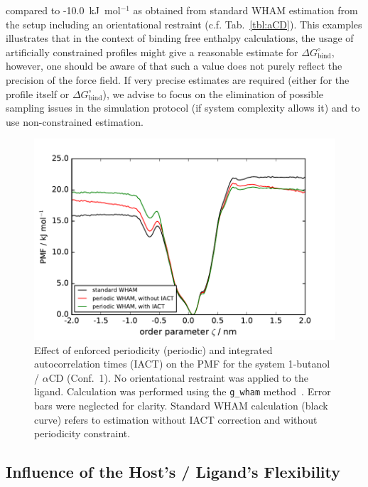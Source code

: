 \documentclass[9pt,lessons,pubversion]{livecoms}
\begin{document}
compared to -10.0~kJ~mol$^{-1}$ as obtained from standard WHAM estimation from the setup including an orientational restraint (c.f. Tab.~\ref{tbl:aCD}).
This examples illustrates that in the context of binding free enthalpy calculations, the usage of artificially constrained profiles might give a reasonable estimate for $\Delta G^\circ_\mathrm{bind}$, 
however, one should be aware of that such a value does not purely reflect the precision of the force field.
If very precise estimates are required (either for the profile itself or $\Delta G^\circ_\mathrm{bind}$), we advise to focus on the elimination of possible sampling issues in the simulation protocol (if system complexity allows it) 
and to use non-constrained estimation.

\begin{figure}
\includegraphics[width=\linewidth]{figures/pmf_aCD_BTL_gwham_cyclic.pdf}
  \caption{Effect of enforced periodicity (periodic) and integrated autocorrelation times (IACT) on the PMF for the system 1-butanol / $\alpha$CD (Conf.~1).
  No orientational restraint was applied to the ligand.
  Calculation was performed using the \texttt{g\_wham} method~\cite{hub2010g_wham}. Error bars were neglected for clarity.
  Standard WHAM calculation (black curve) refers to estimation without IACT correction and without periodicity constraint.
  }
  \label{fig:gwham}
\end{figure}


\subsection{Influence of the Host's / Ligand's Flexibility}
\end{document}

